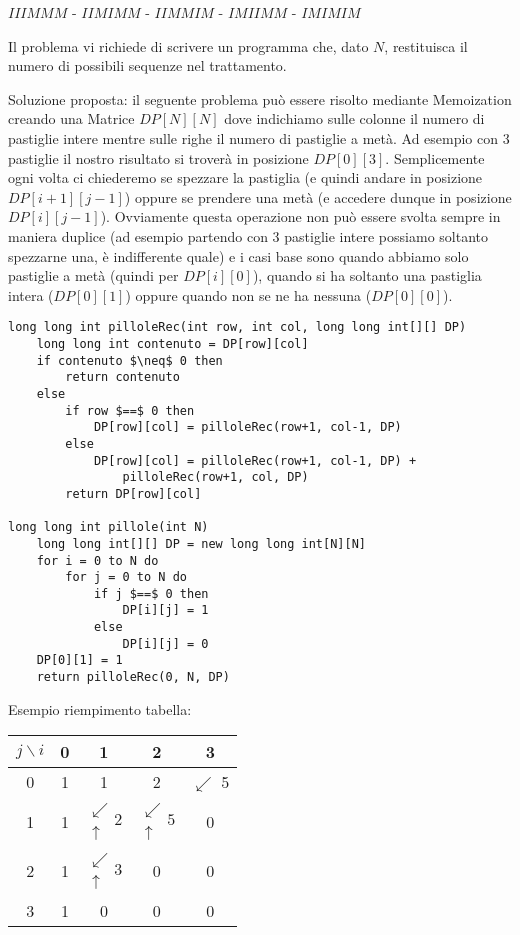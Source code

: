 \documentclass[../cheatSheetAlgoritmi.tex]{subfiles}
\begin{document}
$IIIMMM$ - $IIMIMM$ - $IIMMIM$ - $IMIIMM$ - $IMIMIM$

Il problema vi richiede di scrivere un programma che, dato $N$, restituisca il numero di possibili sequenze nel trattamento.

\bigskip

Soluzione proposta: il seguente problema può essere risolto mediante Memoization creando una Matrice $DP[N][N]$ dove indichiamo sulle colonne il numero di pastiglie intere mentre sulle righe il numero di pastiglie a metà. Ad esempio con 3 pastiglie il nostro risultato si troverà in posizione $DP[0][3]$. Semplicemente ogni volta ci chiederemo se spezzare la pastiglia (e quindi andare in posizione $DP[i+1][j-1]$) oppure se prendere una metà (e accedere dunque in posizione $DP[i][j-1]$). Ovviamente questa operazione non può essere svolta sempre in maniera duplice (ad esempio partendo con 3 pastiglie intere possiamo soltanto spezzarne una, è indifferente quale) e i casi base sono quando abbiamo solo pastiglie a metà (quindi per $DP[i][0]$), quando si ha soltanto una pastiglia intera ($DP[0][1]$) oppure quando non se ne ha nessuna ($DP[0][0]$).
\begin{lstlisting}[caption=Le pillole della Zia]
long long int pilloleRec(int row, int col, long long int[][] DP)
	long long int contenuto = DP[row][col]
	if contenuto $\neq$ 0 then
		return contenuto
	else
		if row $==$ 0 then
			DP[row][col] = pilloleRec(row+1, col-1, DP)
		else
			DP[row][col] = pilloleRec(row+1, col-1, DP) + 
				pilloleRec(row+1, col, DP)
		return DP[row][col]

long long int pillole(int N)
	long long int[][] DP = new long long int[N][N]
	for i = 0 to N do
		for j = 0 to N do
			if j $==$ 0 then
				DP[i][j] = 1
			else
				DP[i][j] = 0
	DP[0][1] = 1
	return pilloleRec(0, N, DP)
\end{lstlisting}
Esempio riempimento tabella:

\begin{center}
	\renewcommand{\arraystretch}{1.2}
	\begin{tabular}{ |c|c|c|c|c| } 
		\hline
			$j \backslash i$ &0 &1 &2 &3\\
		\hline
			0 &1 &1 &2 &$\swarrow$ 5\\
		\hline
			1 &1 & $\substack{\swarrow\\[-1em] \uparrow} 2$ & $\substack{\swarrow\\[-1em] \uparrow} 5$&0 \\
		\hline
			2 &1 & $\substack{\swarrow\\[-1em] \uparrow} 3$ &0 &0\\
		\hline
			3 &1 &0 &0 &0\\
		\hline
	\end{tabular}
\end{center}
\newpage
\end{document}
